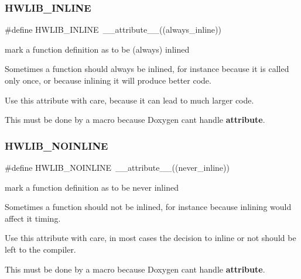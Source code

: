 \subsubsection{\texorpdfstring{H\+W\+L\+I\+B\+\_\+\+I\+N\+L\+I\+NE}{HWLIB\_INLINE}}
{\footnotesize\ttfamily \#define H\+W\+L\+I\+B\+\_\+\+I\+N\+L\+I\+NE~\+\_\+\+\_\+attribute\+\_\+\+\_\+((always\+\_\+inline))}

mark a function definition as to be (always) inlined

Sometimes a function should always be inlined, for instance because it is called only once, or because inlining it will produce better code.

Use this attribute with care, because it can lead to much larger code.

This must be done by a macro because Doxygen can\textquotesingle{}t handle {\bfseries attribute}. \mbox{\label{hwlib-defines_8hpp_a2bec10dcdff9c6b29f603813007f2ffa}} 
\subsubsection{\texorpdfstring{H\+W\+L\+I\+B\+\_\+\+N\+O\+I\+N\+L\+I\+NE}{HWLIB\_NOINLINE}}
{\footnotesize\ttfamily \#define H\+W\+L\+I\+B\+\_\+\+N\+O\+I\+N\+L\+I\+NE~\+\_\+\+\_\+attribute\+\_\+\+\_\+((never\+\_\+inline))}

mark a function definition as to be never inlined

Sometimes a function should not be inlined, for instance because inlining would affect it timing.

Use this attribute with care, in most cases the decision to inline or not should be left to the compiler.

This must be done by a macro because Doxygen can\textquotesingle{}t handle {\bfseries attribute}. \mbox{\label{hwlib-defines_8hpp_aef311f1f416fdcbd1fa22376dcc01029}} 
